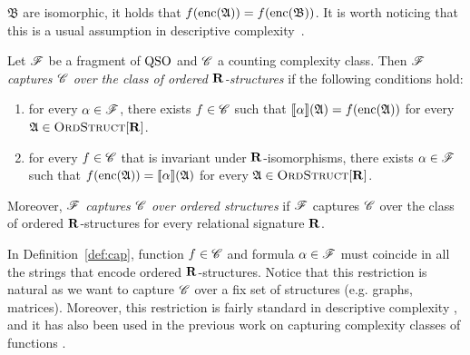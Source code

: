 $\mathfrak{B}$ are isomorphic, it holds that $f({\rm enc}(\mathfrak{A})) = f({\rm enc}(\mathfrak{B}))$. It is worth noticing that this is a usual assumption in descriptive complexity~\cite{L04}.
\begin{definition} \label{def:cap}
	Let $\mathscr{F}$ be a fragment of ${\rm QSO}$ and $\mathscr{C}$ a counting complexity class. Then {\em  $\mathscr{F}$ captures $\mathscr{C}$ over the class of ordered $\mathbf{R}$-structures} if the  following conditions hold:
	\begin{enumerate}
		\item for every $\alpha \in \mathscr{F}$, there exists $f \in \mathscr{C}$ such that ${\llbracket{}{\alpha}\rrbracket}(\mathfrak{A}) = f({\rm enc}(\mathfrak{A}))$ for every $\mathfrak{A} \in \text{\sc OrdStruct}[\mathbf{R}]$. 
		
		\item for every $f \in \mathscr{C}$ that is invariant under $\mathbf{R}$-isomorphisms, there exists $\alpha \in \mathscr{F}$ such that   $f({\rm enc}(\mathfrak{A})) = {\llbracket{}{\alpha}\rrbracket}(\mathfrak{A})$ for every $\mathfrak{A} \in \text{\sc OrdStruct}[\mathbf{R}]$.
	\end{enumerate} 
	Moreover, {\em $\mathscr{F}$ captures $\mathscr{C}$ over ordered structures} if $\mathscr{F}$ captures $\mathscr{C}$ over the class of ordered $\mathbf{R}$-structures for every relational signature $\mathbf{R}$.
\end{definition}
In Definition~\ref{def:cap}, function $f \in \mathscr{C}$ and formula $\alpha \in \mathscr{F}$ must coincide in all the strings that encode ordered $\mathbf{R}$-structures. Notice that this restriction is natural as we want to capture %
$\mathscr{C}$ over a fix set of structures (e.g. graphs, matrices).
Moreover, this restriction is fairly standard in descriptive complexity \cite{immerman1999descriptive,L04}, and it has also been used in the previous work on capturing complexity classes of functions \cite{SalujaST95,ComptonG96}.

